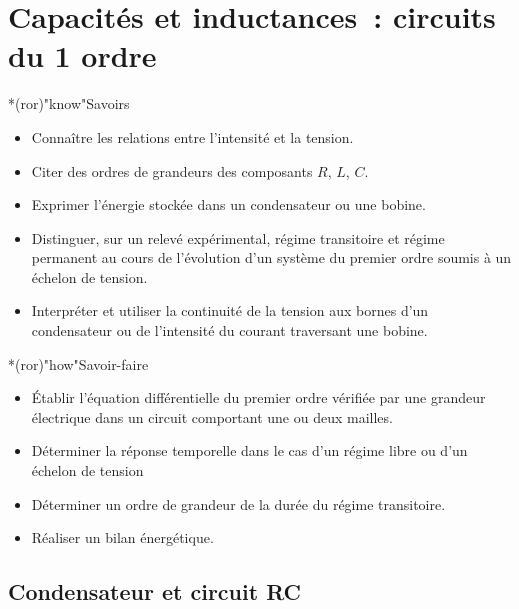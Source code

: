 \documentclass[../../main/main.tex]{subfiles}
\begin{document}
\setcounter{chapter}{2}

\chapter{Capacit\'es et inductances~: circuits du 1\ier{} ordre}

\vfill

\begin{prgm}
	\begin{tcb}*(ror)"know"{Savoirs}
		\begin{itemize}[label=$\diamond$, leftmargin=10pt]
			\item Connaître les relations entre l'intensité et la tension.
			\item Citer des ordres de grandeurs des composants $R$, $L$, $C$.
			\item Exprimer l'énergie stockée dans un condensateur ou une bobine.
			\item Distinguer, sur un relevé expérimental, régime transitoire et
			      régime permanent au cours de l'évolution d'un système du premier
			      ordre soumis à un échelon de tension.
			\item Interpréter et utiliser la continuité de la tension aux bornes d'un
			      condensateur ou de l'intensité du courant traversant une bobine.
		\end{itemize}
	\end{tcb}

	\begin{tcb}*(ror)"how"{Savoir-faire}
		\begin{itemize}[label=$\diamond$, leftmargin=10pt]
			\item Établir l'équation différentielle du premier ordre vérifiée par une
			      grandeur électrique dans un circuit comportant une ou deux mailles.
			\item Déterminer la réponse temporelle dans le cas d'un régime libre ou
			      d'un échelon de tension
			\item Déterminer un ordre de grandeur de la durée du régime transitoire.
			\item Réaliser un bilan énergétique.
		\end{itemize}
	\end{tcb}
\end{prgm}

\vfill
\minitoc
\vfill

\newpage

\section{Condensateur et circuit RC}
\end{document}

